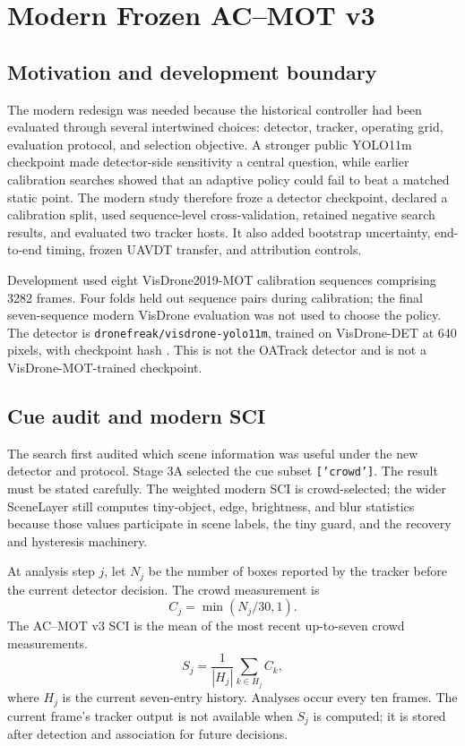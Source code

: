 \section{Modern Frozen AC--MOT v3}
\subsection{Motivation and development boundary}
The modern redesign was needed because the historical controller had been evaluated through several intertwined choices: detector, tracker, operating grid, evaluation protocol, and selection objective. A stronger public YOLO11m checkpoint made detector-side sensitivity a central question, while earlier calibration searches showed that an adaptive policy could fail to beat a matched static point. The modern study therefore froze a detector checkpoint, declared a calibration split, used sequence-level cross-validation, retained negative search results, and evaluated two tracker hosts. It also added bootstrap uncertainty, end-to-end timing, frozen UAVDT transfer, and attribution controls.

Development used eight VisDrone2019-MOT calibration sequences comprising 3282 frames. Four folds held out sequence pairs during calibration; the final seven-sequence modern VisDrone evaluation was not used to choose the policy. The detector is \texttt{dronefreak/visdrone-yolo11m}, trained on VisDrone-DET at 640 pixels, with checkpoint hash \checkpointsha. This is not the OATrack detector and is not a VisDrone-MOT-trained checkpoint.

\subsection{Cue audit and modern SCI}
The search first audited which scene information was useful under the new detector and protocol. Stage 3A selected the cue subset \texttt{['crowd']}. The result must be stated carefully. The weighted modern SCI is crowd-selected; the wider SceneLayer still computes tiny-object, edge, brightness, and blur statistics because those values participate in scene labels, the tiny guard, and the recovery and hysteresis machinery.

At analysis step $j$, let $N_j$ be the number of boxes reported by the tracker before the current detector decision. The crowd measurement is
\begin{equation}
C_j=\min(N_j/30,1).
\end{equation}
The AC--MOT v3 SCI is the mean of the most recent up-to-seven crowd measurements.
\begin{equation}
S_j=\frac{1}{|H_j|}\sum_{k\in H_j}C_k,
\end{equation}
where $H_j$ is the current seven-entry history. Analyses occur every ten frames. The current frame's tracker output is not available when $S_j$ is computed; it is stored after detection and association for future decisions.

